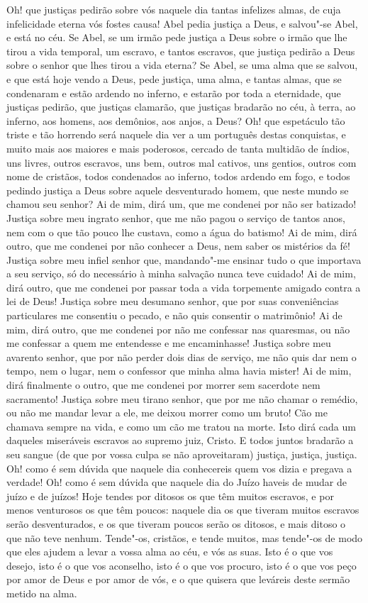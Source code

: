 Oh! que justiças pedirão sobre vós naquele dia tantas infelizes almas,
de cuja infelicidade eterna vós fostes causa! Abel pedia justiça a Deus,
e salvou"-se Abel, e está no céu. Se Abel, se um irmão pede justiça a
Deus sobre o irmão que lhe tirou a vida temporal, um escravo, e tantos
escravos, que justiça pedirão a Deus sobre o senhor que lhes tirou a
vida eterna? Se Abel, se uma alma que se salvou, e que está hoje vendo a
Deus, pede justiça, uma alma, e tantas almas, que se condenaram e estão
ardendo no inferno, e estarão por toda a eternidade, que justiças
pedirão, que justiças clamarão, que justiças bradarão no céu, à terra,
ao inferno, aos homens, aos demônios, aos anjos, a Deus? Oh! que
espetáculo tão triste e tão horrendo será naquele dia ver a um português
destas conquistas, e muito mais aos maiores e mais poderosos,
cercado de tanta multidão de índios, uns livres, outros escravos, uns
bem, outros mal cativos, uns gentios, outros com nome de cristãos, todos
condenados ao inferno, todos ardendo em fogo, e todos pedindo justiça a
Deus sobre aquele desventurado homem, que neste mundo se chamou seu
senhor?
Ai de mim, dirá um, que me condenei por não ser batizado! Justiça sobre
meu ingrato senhor, que me não pagou o serviço de tantos anos, nem com o
que tão pouco lhe custava, como a água do batismo! Ai de mim, dirá
outro, que me condenei por não conhecer a Deus, nem saber os mistérios
da fé! Justiça sobre meu infiel senhor que, mandando"-me ensinar tudo o
que importava a seu serviço, só do necessário à minha salvação nunca
teve cuidado! Ai de mim, dirá outro, que me condenei por passar toda a
vida torpemente amigado contra a lei de Deus! Justiça sobre meu desumano
senhor, que por suas conveniências particulares me consentiu o pecado, e
não quis consentir o matrimônio! Ai de mim, dirá outro, que me condenei
por não me confessar nas quaresmas, ou não me confessar a quem me
entendesse e me encaminhasse! Justiça sobre meu avarento senhor, que por
não perder dois dias de serviço, me não quis dar nem o tempo, nem o
lugar, nem o confessor que minha alma havia mister! Ai de mim, dirá
finalmente o outro, que me condenei por morrer sem sacerdote nem
sacramento! Justiça sobre meu tirano senhor, que por me não chamar o
remédio, ou não me mandar levar a ele, me deixou morrer como um bruto!
Cão me chamava sempre na vida, e como um cão me tratou na morte. Isto
dirá cada um daqueles miseráveis escravos ao supremo juiz, Cristo. E
todos juntos bradarão a seu sangue (de que por vossa culpa se não
aproveitaram) justiça, justiça, justiça. Oh! como é sem dúvida
que naquele dia conhecereis quem vos dizia e pregava a verdade! Oh! como
é sem dúvida que naquele dia do Juízo haveis de mudar de juízo e de
juízos! Hoje tendes por ditosos os que têm muitos escravos, e por menos
venturosos os que têm poucos: naquele dia os que tiveram muitos escravos
serão desventurados, e os que tiveram poucos serão os ditosos, e mais
ditoso o que não teve nenhum. Tende"-os, cristãos, e tende muitos, mas
tende"-os de modo que eles ajudem a levar a vossa alma ao céu, e vós as
suas. Isto é o que vos desejo, isto é o que vos aconselho, isto é o que
vos procuro, isto é o que vos peço por amor de Deus e por amor de vós, e o
que quisera que leváreis deste sermão metido na alma.

